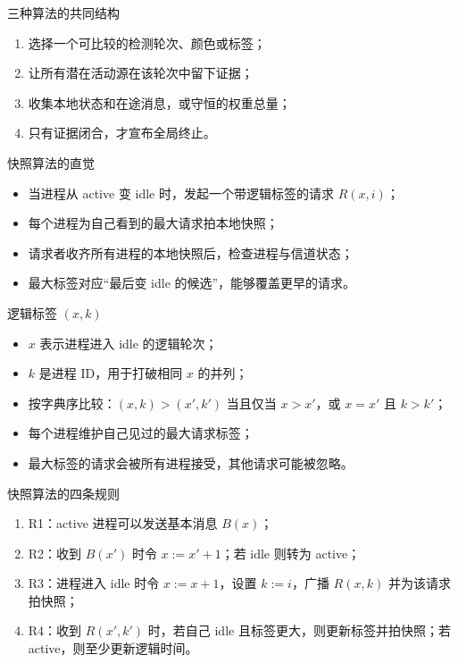 \documentclass[UTF8,fontset=none,aspectratio=169,10pt]{beamer}
\begin{document}
\begin{frame}{三种算法的共同结构}
\begin{enumerate}
  \item 选择一个可比较的检测轮次、颜色或标签；
  \item 让所有潜在活动源在该轮次中留下证据；
  \item 收集本地状态和在途消息，或守恒的权重总量；
  \item 只有证据闭合，才宣布全局终止。
\end{enumerate}
\vfill
{}
\end{frame}


\begin{frame}{快照算法的直觉}
\begin{itemize}
  \item 当进程从 active 变 idle 时，发起一个带逻辑标签的请求 $R(x,i)$；
  \item 每个进程为自己看到的最大请求拍本地快照；
  \item 请求者收齐所有进程的本地快照后，检查进程与信道状态；
  \item 最大标签对应“最后变 idle 的候选”，能够覆盖更早的请求。
\end{itemize}
\end{frame}

\begin{frame}{逻辑标签 $(x,k)$}
\begin{itemize}
  \item $x$ 表示进程进入 idle 的逻辑轮次；
  \item $k$ 是进程 ID，用于打破相同 $x$ 的并列；
  \item 按字典序比较：$(x,k)>(x',k')$ 当且仅当 $x>x'$，或 $x=x'$ 且 $k>k'$；
  \item 每个进程维护自己见过的最大请求标签；
  \item 最大标签的请求会被所有进程接受，其他请求可能被忽略。
\end{itemize}
\end{frame}

\begin{frame}{快照算法的四条规则}
\scriptsize
\begin{enumerate}
  \item R1：active 进程可以发送基本消息 $B(x)$；
  \item R2：收到 $B(x')$ 时令 $x:=x'+1$；若 idle 则转为 active；
  \item R3：进程进入 idle 时令 $x:=x+1$，设置 $k:=i$，广播 $R(x,k)$ 并为该请求拍快照；
  \item R4：收到 $R(x',k')$ 时，若自己 idle 且标签更大，则更新标签并拍快照；若 active，则至少更新逻辑时间。
\end{enumerate}
\vfill
{}
\end{frame}
\end{document}
